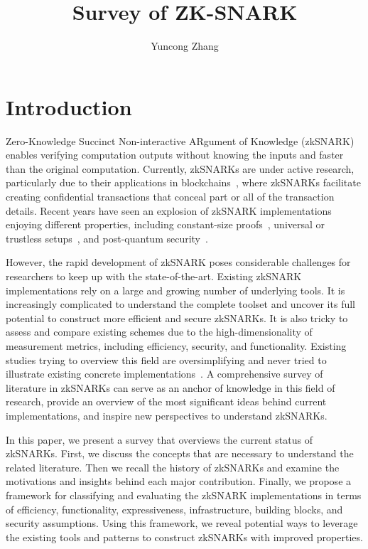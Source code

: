 \documentclass[acmlarge]{acmart}
\title{Survey of ZK-SNARK}
\author{Yuncong Zhang}
\affiliation{%
  \institution{Shanghai Jiao Tong University}
  \streetaddress{Dongchuan Rd. 800}
  \city{Minhang}
  \state{Shanghai}
  \postcode{200240}
}
\begin{document}
\begin{abstract}
\end{abstract}

\maketitle

\section{Introduction}

Zero-Knowledge Succinct Non-interactive ARgument of Knowledge (zkSNARK)~\cite{BitanskyCCT12} enables verifying computation outputs without knowing the inputs and faster than the original computation.
Currently, zkSNARKs are under active research, particularly due to their applications in blockchains~\cite{Ben-SassonCG0MTV14, SunALY17}, where zkSNARKs facilitate creating confidential transactions that conceal part or all of the transaction details.
Recent years have seen an explosion of zkSNARK implementations enjoying different properties, including constant-size proofs~\cite{Groth16, GennaroGP013, Ben-SassonCGTV13, ParnoHG013, Ben-SassonCTV13}, universal or trustless setups~\cite{GrothKMMM18, MallerBKM19, BunzFS20, Ben-SassonBHR18, Ben-SassonCRSVW19, AmesHIV17}, and post-quantum security~\cite{Ben-SassonBHR18, Ben-SassonCRSVW19}.


However, the rapid development of zkSNARK poses considerable challenges for researchers to keep up with the state-of-the-art.
Existing zkSNARK implementations rely on a large and growing number of underlying tools.
It is increasingly complicated to understand the complete toolset and uncover its full potential to construct more efficient and secure zkSNARKs.
It is also tricky to assess and compare existing schemes due to the high-dimensionality of measurement metrics, including efficiency, security, and functionality.
Existing studies trying to overview this field are oversimplifying and never tried to illustrate existing concrete implementations~\cite{ZKProof20, Nitulescu19, WalfishB15}.
A comprehensive survey of literature in zkSNARKs can serve as an anchor of knowledge in this field of research, provide an overview of the most significant ideas behind current implementations, and inspire new perspectives to understand zkSNARKs.

In this paper, we present a survey that overviews the current status of zkSNARKs.
First, we discuss the concepts that are necessary to understand the related literature.
Then we recall the history of zkSNARKs and examine the motivations and insights behind each major contribution.
Finally, we propose a framework for classifying and evaluating the zkSNARK implementations in terms of efficiency, functionality, expressiveness, infrastructure, building blocks, and security assumptions.
Using this framework, we reveal potential ways to leverage the existing tools and patterns to construct zkSNARKs with improved properties.
\end{document}
